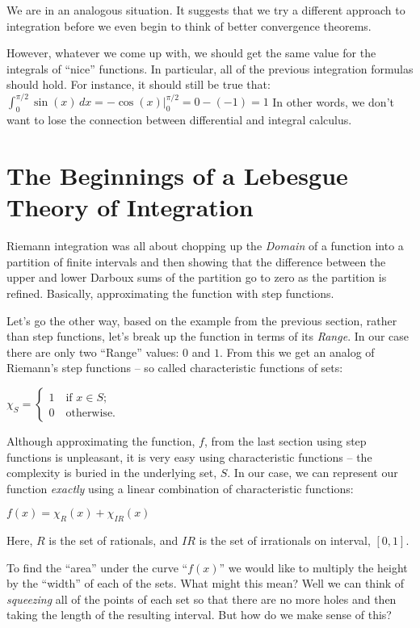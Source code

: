 \documentclass{article}
\begin{document}
We are in an analogous situation. It suggests that 
we try a different approach to integration before we even
begin to think of better convergence theorems. 

However, whatever we come up with, we should get the same value for the 
integrals of ``nice'' functions. In particular, all of the previous integration 
formulas should hold. For instance, it should still be true that: 
$\int_0^{\pi / 2} \sin(x) \, dx = -\cos(x)|_{0}^{\pi / 2} = 0 - (-1) = 1$
In other words, we don't want to lose the connection between differential and
integral calculus.


\section{The Beginnings of a Lebesgue Theory of Integration}

Riemann integration was all about chopping up the {\em Domain\/} of a function 
into a partition of finite intervals and then showing that the difference 
between the upper and lower Darboux sums of the partition 
go to zero as the partition is refined. Basically, approximating the function 
with step functions.

Let's go the other way, based on the example from the previous section, rather 
than step functions, let's break up the function in terms of its {\em Range\/}. 
In our case there are only two ``Range'' values: $0$ and $1$. From this we get an 
analog of Riemann's step functions -- 
so called characteristic functions of sets:

$\chi_{S} = \begin{cases} 1 \quad \text{if $x \in  S$;} \\ 0 \quad \text{otherwise.} \end{cases}$

Although approximating the function, $f$, from the last section using step 
functions is unpleasant, it is very easy using characteristic functions -- the complexity 
is buried in the underlying set, $S$. In our case, we can represent our function {\em exactly\/}
using a linear combination of characteristic functions:

$f(x) = \chi_{R}(x) + \chi_{IR}(x)$

Here, $R$ is the set of rationals, and $IR$ is the set of irrationals on interval, $[0, 1]$.

To find the ``area'' under the curve ``$f(x)$'' we would like to multiply the 
height by the ``width'' of each of the sets. What might this mean?
Well we can think of {\em squeezing\/} all of the points of each set so that there are 
no more holes and then taking the length of the resulting interval.
But how do we make sense of this?
\end{document}
